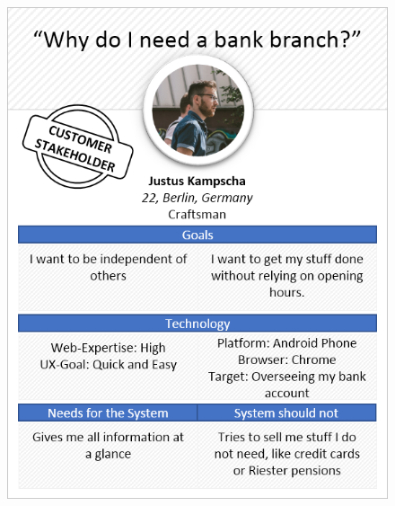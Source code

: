 \begin{figure}[H] 
        \centering\includegraphics[width=\textwidth]{img/diagrams/personas/user1.png}
	\captionsetup{labelformat=empty}
        \caption[]{}
\end{figure}
